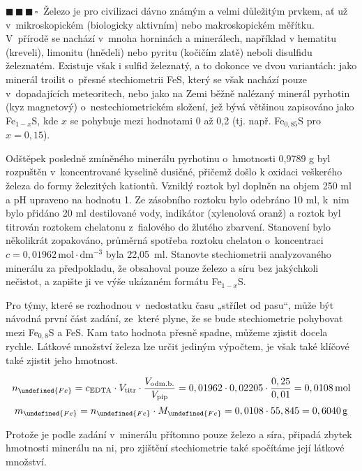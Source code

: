 \documentclass{book}
\let\ch\undefined
\newcommand{\tri}{$\blacksquare \, \blacksquare \, \blacksquare \, \square \; \; $}
\renewenvironment{quotation}{\par}{\par} %
\begin{document}
\hrulefill %
\begin{quotation}
\tri Železo je pro civilizaci dávno známým a velmi důležitým prvkem, ať
už v~mikroskopickém (biologicky aktivním) nebo makroskopickém měřítku. V~přírodě se nachází v~mnoha horninách a minerálech, například
v hematitu (kreveli), limonitu (hnědeli) nebo pyritu (kočičím zlatě)
neboli disulfidu železnatém. Existuje však i sulfid železnatý, a to
dokonce ve dvou variantách: jako minerál troilit o~přesné stechiometrii
FeS, který se však nachází pouze v~dopadajících meteoritech, nebo jako
na Zemi běžně nalézaný minerál pyrhotin (kyz magnetový) o~nestechiometrickém
složení, jež bývá většinou zapisováno jako Fe$_{1-x}$S, kde $x$ se
pohybuje mezi hodnotami 0 až 0,2 (tj. např. Fe$_{0,85}$S pro $x =
0,15$). 

Odštěpek posledně zmíněného minerálu pyrhotinu o~hmotnosti 0,9789
g byl rozpuštěn v~koncentrované kyselině dusičné, přičemž došlo k
oxidaci veškerého železa do formy železitých kationtů. Vzniklý roztok
byl doplněn na objem 250 ml a pH upraveno na hodnotu 1. Ze zásobního
roztoku bylo odebráno 10 ml, k~nim bylo přidáno 20 ml destilované
vody, indikátor (xylenolová oranž) a roztok byl titrován roztokem
chelatonu z~fialového do žlutého zbarvení. Stanovení bylo několikrát
zopakováno, průměrná spotřeba roztoku chelaton o~koncentraci $c=0,01962\mathrm{\,mol\cdot dm^{-3}}$
byla 22,05~ml. Stanovte stechiometrii analyzovaného minerálu za předpokladu,
že obsahoval pouze železo a síru bez jakýchkoli nečistot, a zapište
ji ve výše ukázaném formátu Fe$_{1-x}$S. 
\end{quotation} \dotfill \par 
Pro týmy, které se rozhodnou v~nedostatku času „střílet od pasu“,
může být návodná první část zadání, ze~které plyne, že se bude stechiometrie
pohybovat mezi Fe$_{0,8}$S a FeS. Kam tato hodnota přesně spadne,
můžeme zjistit docela rychle. Látkové množství železa lze určit jediným
výpočtem, je však také klíčové také zjistit jeho hmotnost. 

\[
n_{\ch{Fe}}=c_{\mathrm{EDTA}}\cdot\-V_{\mathrm{titr}}\cdot\-\frac{V_{\mathrm{odm.b.}}}{V_{\mathrm{pip}}}=0,01962\cdot0,02205\cdot\frac{0,25}{0,01}=0,0108\,\mathrm{mol}
\]
\[
m_{\ch{Fe}}=n_{\ch{Fe}}\cdot\-M_{\ch{Fe}}=0,0108\cdot55,845=0,6040\,\mathrm{g}
\]

Protože je podle zadání v~minerálu přítomno pouze železo a síra, připadá
zbytek hmotnosti minerálu na ni, pro zjištění stechiometrie také spočítáme
její látkové množství. 
\end{document}

